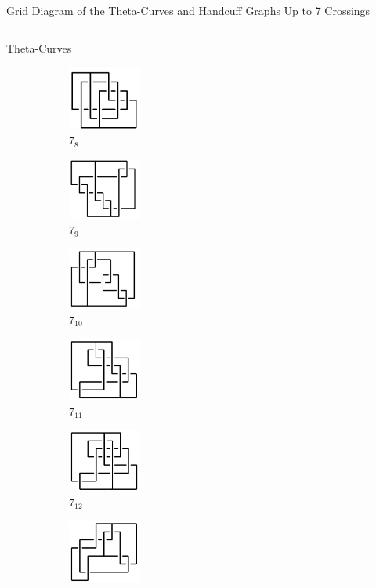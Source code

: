 \documentclass[final]{beamer}
\begin{document}
\begin{frame}[t]
\begin{alertblock}{Grid Diagram of the Theta-Curves and Handcuff Graphs Up to 7 Crossings}
\begin{columns}[t]
\begin{column}{0.6\textwidth}
\begin{alertblock}{Theta-Curves}
\begin{figure}
    \begin{subfigure}{0.075\textwidth}
    \includegraphics[width=2.4cm]{../Midterm_Poster/grid_diagram/theta_7_8.png}
    \caption{$7_{8}$} 
    \end{subfigure}
    \begin{subfigure}{0.075\textwidth}
    \includegraphics[width=2.4cm]{../Midterm_Poster/grid_diagram/theta_7_9.png}
    \caption{$7_{9}$} 
    \end{subfigure}
    \begin{subfigure}{0.075\textwidth}
    \includegraphics[width=2.4cm]{../Midterm_Poster/grid_diagram/theta_7_10.png}
    \caption{$7_{10}$} 
    \end{subfigure}
    \begin{subfigure}{0.075\textwidth}
    \includegraphics[width=2.4cm]{../Midterm_Poster/grid_diagram/theta_7_11.png}
    \caption{$7_{11}$} 
    \end{subfigure}
    \begin{subfigure}{0.075\textwidth}
    \includegraphics[width=2.4cm]{../Midterm_Poster/grid_diagram/theta_7_12.png}
    \caption{$7_{12}$} 
    \end{subfigure}
    \begin{subfigure}{0.075\textwidth}
    \includegraphics[width=2.4cm]{../Midterm_Poster/grid_diagram/theta_7_13.png}

\end{subfigure}
\end{figure}
\end{alertblock}
\end{column}
\end{columns}
\end{alertblock}
\end{frame}
\end{document}
